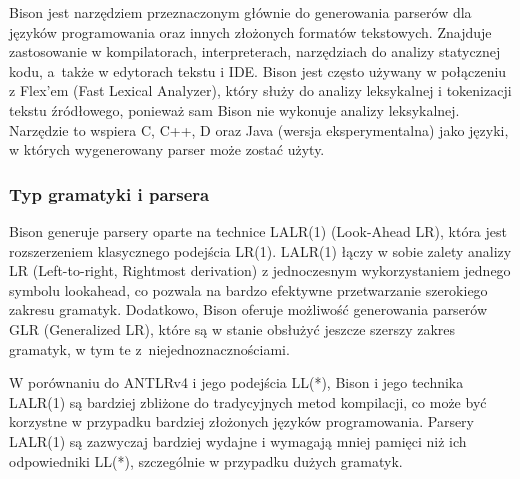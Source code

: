 \documentclass[12pt,twoside]{article}
\begin{document}
Bison jest narzędziem przeznaczonym głównie do generowania parserów dla języków programowania oraz innych złożonych formatów tekstowych. Znajduje zastosowanie w kompilatorach, interpreterach, narzędziach do analizy statycznej kodu, a~także w edytorach tekstu i IDE. Bison jest często używany w połączeniu z Flex'em (Fast Lexical Analyzer), który służy do analizy leksykalnej i tokenizacji tekstu źródłowego, ponieważ sam Bison nie wykonuje analizy leksykalnej. Narzędzie to wspiera C, C++, D oraz Java (wersja eksperymentalna) jako języki, w których wygenerowany parser może zostać użyty.\cite{biosonOrg}
\subsubsection{Typ gramatyki i parsera}
Bison generuje parsery oparte na technice LALR(1) (Look-Ahead LR), która jest rozszerzeniem klasycznego podejścia LR(1). LALR(1) łączy w sobie zalety analizy LR (Left-to-right, Rightmost derivation) z jednoczesnym wykorzystaniem jednego symbolu lookahead, co pozwala na bardzo efektywne przetwarzanie szerokiego zakresu gramatyk. Dodatkowo, Bison oferuje możliwość generowania parserów GLR (Generalized LR), które są w stanie obsłużyć jeszcze szerszy zakres gramatyk, w tym te z~niejednoznacznościami.\cite{biosonOrg}

W porównaniu do ANTLRv4 i jego podejścia LL(*), Bison i jego technika LALR(1) są bardziej zbliżone do tradycyjnych metod kompilacji, co może być korzystne w przypadku bardziej złożonych języków programowania. Parsery LALR(1) są zazwyczaj bardziej wydajne i wymagają mniej pamięci niż ich odpowiedniki LL(*), szczególnie w przypadku dużych gramatyk. \cite{LLvsLR}
\end{document}
